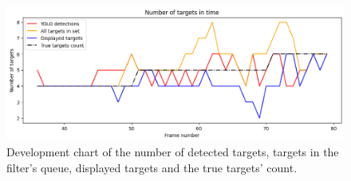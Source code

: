 \begin{figure}[H]
    \centering
    \includegraphics[width=\linewidth]{../../../experiments/E1/V1/YOLO/yolo_det}
    \caption{Development chart of the number of detected targets, targets in the filter's queue, displayed targets and
    the true
    targets' count.}
    \label{gr:E1-V1-S1}
\end{figure}

